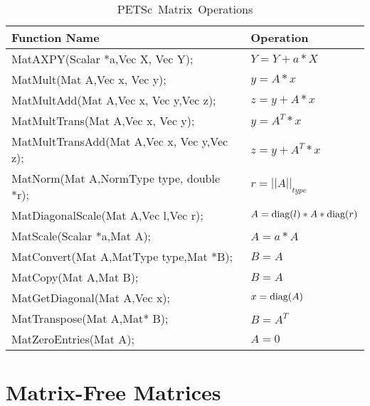 \begin{table}[H]
\begin{center}
\begin{tabular}{ll}
{\bf Function Name} & {\bf Operation} \\
\hline
MatAXPY(Scalar *a,Vec X, Vec Y); & $ Y = Y + a*X $ \\
MatMult(Mat A,Vec x, Vec y); & $ y = A*x $ \\
MatMultAdd(Mat A,Vec x, Vec y,Vec z); & $ z = y + A*x $ \\
MatMultTrans(Mat A,Vec x, Vec y); & $ y = A^{T}*x $ \\
MatMultTransAdd(Mat A,Vec x, Vec y,Vec z); & $ z = y + A^{T}*x $ \\
MatNorm(Mat A,NormType type,  double *r); & $ r = ||A||_{type}$\\
MatDiagonalScale(Mat A,Vec l,Vec r); & $ A = \hbox{diag}(l)*A*\hbox{diag}(r) $\\
MatScale(Scalar *a,Mat A); & $ A = a*A $\\
MatConvert(Mat A,MatType type,Mat *B); & $ B = A $\\
MatCopy(Mat A,Mat B); &  $ B = A $\\
MatGetDiagonal(Mat A,Vec x); & $ x = \hbox{diag}(A)$ \\
MatTranspose(Mat A,Mat* B); & $ B = A^{T} $ \\
MatZeroEntries(Mat A); & $ A = 0 $\\
\hline 
\end{tabular}
\end{center}
\caption{\hbox{PETSc Matrix Operations}}
\label{fig:matrixops}
\end{table}

\section{Matrix-Free Matrices} 

